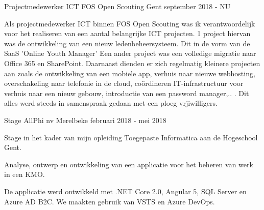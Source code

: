 


\begin{cventries}

\cventry
{Projectmedewerker ICT} %
{FOS Open Scouting} %
{Gent} %
{september 2018 - NU} %
{ %
\begin{cvitems}
\item {Als projectmedewerker ICT binnen FOS Open Scouting was ik verantwoordelijk voor het realiseren van een aantal belangrijke ICT projecten.
1 project hiervan was de ontwikkeling van een nieuw ledenbeheersysteem. Dit in de vorm van de SaaS 'Online Youth Manager' Een ander project was een volledige migratie naar Office 365 en SharePoint. Daarnaast dienden er zich regelmatig kleinere projecten aan zoals de ontwikkeling van een mobiele app, verhuis naar nieuwe webhosting, overschakeling naar telefonie in de cloud, coördineren IT-infrastructuur voor verhuis naar een nieuw gebouw, introductie van een password manager,.. . Dit alles werd steeds in samenspraak gedaan met een ploeg vrjiwilligers.
}
\end{cvitems}
}


\cventry
{Stage} %
{AllPhi nv} %
{Merelbeke} %
{februari 2018 - mei 2018} %
{ %
\begin{cvitems}
\item {Stage in het kader van mijn opleiding Toegepaste Informatica aan de Hogeschool Gent.}
\item {Analyse, ontwerp en ontwikkeling van een applicatie voor het beheren van werk in een KMO.}
\item {De applicatie werd ontwikkeld met .NET Core 2.0, Angular 5, SQL Server en Azure AD B2C. We maakten gebruik van VSTS en Azure DevOps.}
\end{cvitems}
}



\end{cventries}
